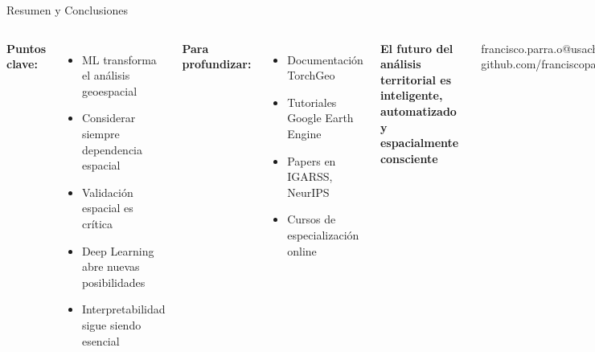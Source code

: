 \documentclass[10pt,aspectratio=169]{beamer}
\begin{document}
\begin{frame}{Resumen y Conclusiones}
    \begin{columns}
        \textbf{Puntos clave:}
        \begin{itemize}
            \item ML transforma el análisis geoespacial
            \item Considerar siempre dependencia espacial
            \item Validación espacial es crítica
            \item Deep Learning abre nuevas posibilidades
            \item Interpretabilidad sigue siendo esencial
        \end{itemize}

        \vspace{3mm}
        \textbf{Para profundizar:}
        \begin{itemize}
            \item Documentación TorchGeo
            \item Tutoriales Google Earth Engine
            \item Papers en IGARSS, NeurIPS
            \item Cursos de especialización online
        \end{itemize}

        \begin{center}
            \colorbox{usachblue!20}{
                \parbox{0.9\columnwidth}{
                    \centering
                    \textbf{El futuro del análisis territorial es inteligente, automatizado y espacialmente consciente}
                }
            }
        \end{center}

        \vspace{5mm}
        \begin{center}
            \faEnvelope\ francisco.parra.o@usach.cl\\
            \faGithub\ github.com/franciscoparrao
        \end{center}
    \end{columns}
\end{frame}
\end{document}
